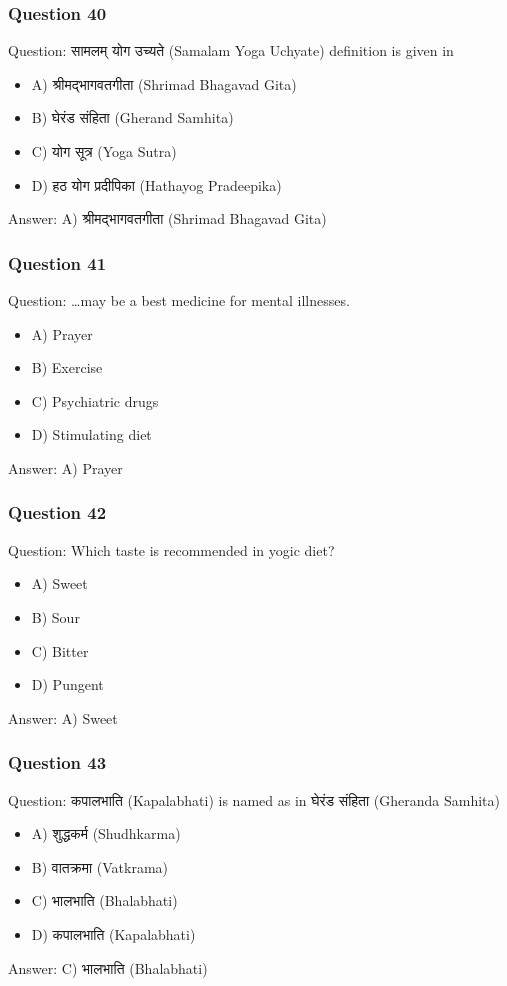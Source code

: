 \begin{frame}[fragile]\frametitle{Question 40}
Question: सामलम् योग उच्यते (Samalam Yoga Uchyate) definition is given in
\begin{itemize}
\item A) श्रीमद्भागवतगीता (Shrimad Bhagavad Gita)
\item B) घेरंड संहिता (Gherand Samhita)
\item C) योग सूत्र (Yoga Sutra)
\item D) हठ योग प्रदीपिका (Hathayog Pradeepika)
\end{itemize}
Answer: A) श्रीमद्भागवतगीता (Shrimad Bhagavad Gita)
\end{frame}


\begin{frame}[fragile]\frametitle{Question 41}
Question: \ldots may be a best medicine for mental illnesses.
\begin{itemize}
\item A) Prayer
\item B) Exercise
\item C) Psychiatric drugs
\item D) Stimulating diet
\end{itemize}
Answer: A) Prayer
\end{frame}

\begin{frame}[fragile]\frametitle{Question 42}
Question: Which taste is recommended in yogic diet?
\begin{itemize}
\item A) Sweet
\item B) Sour
\item C) Bitter
\item D) Pungent
\end{itemize}
Answer: A) Sweet
\end{frame}

\begin{frame}[fragile]\frametitle{Question 43}
Question: कपालभाति (Kapalabhati) is named as in घेरंड संहिता (Gheranda Samhita)
\begin{itemize}
\item A) शुद्धकर्म (Shudhkarma)
\item B) वातक्रमा (Vatkrama)
\item C) भालभाति (Bhalabhati)
\item D) कपालभाति (Kapalabhati)
\end{itemize}
Answer: C) भालभाति (Bhalabhati)
\end{frame}

